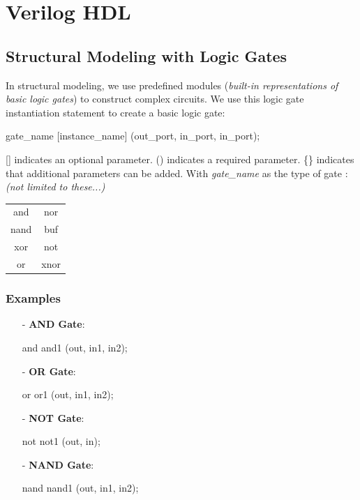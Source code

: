 \documentclass[12pt,openany, tikz,border=10pt]{book}
\begin{document}
\section{Verilog HDL}
\subsection{Structural Modeling with Logic Gates}
In structural modeling, we use predefined modules (\textit{built-in representations of basic logic gates}) to construct complex circuits.\newline
\vspace{5px}
We use this logic gate instantiation statement to create a basic logic gate:
\begin{vhdl}
    gate_name [instance_name] (out_port, in_port{, in_port});
\end{vhdl}
[] indicates an optional parameter.\newline
()  indicates a required parameter. \newline
\{\} indicates that additional parameters can be added. \newline
\vspace*{10px}
With \textit{gate\_name} as the type of gate :\newline
\textit{(not limited to these...)}

\begin{center}
    \begin{tabular}{|c|c|}
        \hline
        and  &  nor \\
        nand &  buf \\
        xor &  not \\
        or &  xnor \\
        \hline
    \end{tabular}
\end{center}

\subsubsection{Examples}

\begin{itemize}
    \item[-] \textbf{AND Gate}:
    \begin{vhdl}
        and and1 (out, in1, in2);
    \end{vhdl}
    \item[-] \textbf{OR Gate}:
    \begin{vhdl}
        or or1 (out, in1, in2);
    \end{vhdl}
    \item[-] \textbf{NOT Gate}:
    \begin{vhdl}
        not not1 (out, in);
    \end{vhdl}
    \item[-] \textbf{NAND Gate}:
    \begin{vhdl}
        nand nand1 (out, in1, in2);
    \end{vhdl}
\end{itemize}
\newpage
\end{document}

